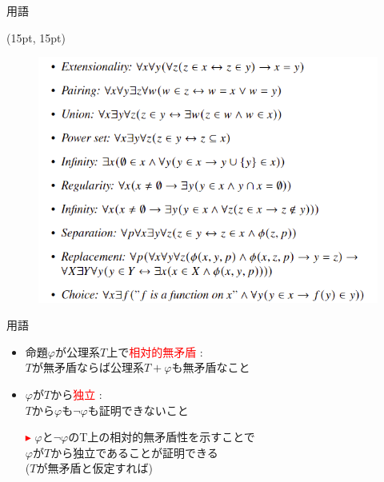 \documentclass[17pt]{beamer}
\begin{document}
\begin{frame}{用語}
    \begin{textblock*}{\linewidth}(15pt, 15pt)
        \begin{figure}
            \includegraphics[width=\linewidth]{./images/ZFC.png}
        \end{figure}
    \end{textblock*}
\end{frame}

\begin{frame}{用語}\,
    \vspace{-20pt}
    {\small 
        \begin{itemize}[itemsep=8pt]
            \item 命題$\varphi$が公理系$T$上で\textcolor{red}{相対的無矛盾} :\\
            $T$が無矛盾ならば公理系$T+\varphi$も無矛盾なこと
            \item $\varphi$が$T$から\textcolor{red}{独立} : \\
            $T$から$\varphi$も$\neg\varphi$も証明できないこと   
        \end{itemize}

        \begin{itemize}
            \item [\textcolor{red}{$\blacktriangleright$}]
            $\varphi$と$\neg\varphi$のT上の相対的無矛盾性を示すことで\\
            $\varphi$が$T$から独立であることが証明できる\\
            ($T$が無矛盾と仮定すれば)
        \end{itemize}
    }
\end{frame}
\end{document}
